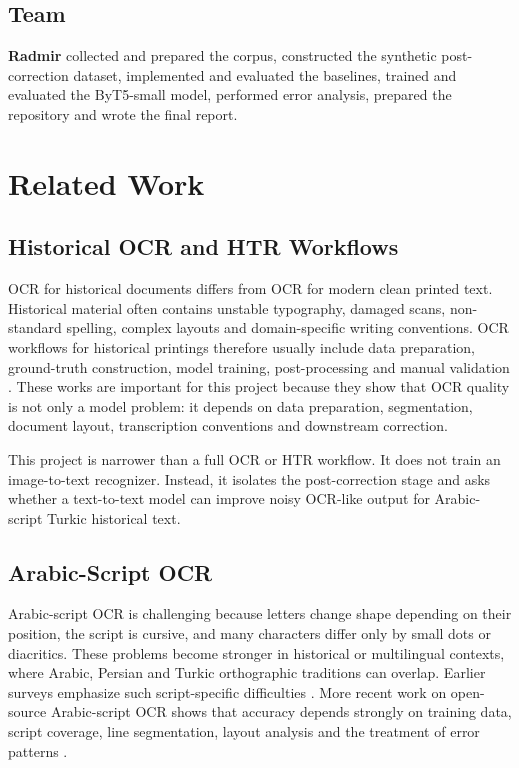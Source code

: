 \documentclass{article}
\begin{document}
\subsection{Team}

\textbf{Radmir} collected and prepared the corpus, constructed the synthetic post-correction dataset, implemented and evaluated the baselines, trained and evaluated the ByT5-small model, performed error analysis, prepared the repository and wrote the final report.


\section{Related Work}
\label{sec:related}

\subsection{Historical OCR and HTR Workflows}

OCR for historical documents differs from OCR for modern clean printed text. Historical material often contains unstable typography, damaged scans, non-standard spelling, complex layouts and domain-specific writing conventions. OCR workflows for historical printings therefore usually include data preparation, ground-truth construction, model training, post-processing and manual validation \cite{reul2019ocr4all,springmann2018ocr}. These works are important for this project because they show that OCR quality is not only a model problem: it depends on data preparation, segmentation, document layout, transcription conventions and downstream correction.

This project is narrower than a full OCR or HTR workflow. It does not train an image-to-text recognizer. Instead, it isolates the post-correction stage and asks whether a text-to-text model can improve noisy OCR-like output for Arabic-script Turkic historical text.

\subsection{Arabic-Script OCR}

Arabic-script OCR is challenging because letters change shape depending on their position, the script is cursive, and many characters differ only by small dots or diacritics. These problems become stronger in historical or multilingual contexts, where Arabic, Persian and Turkic orthographic traditions can overlap. Earlier surveys emphasize such script-specific difficulties \cite{naz2014arabicocr}. More recent work on open-source Arabic-script OCR shows that accuracy depends strongly on training data, script coverage, line segmentation, layout analysis and the treatment of error patterns \cite{kiessling2024arabicocr}.
\end{document}
